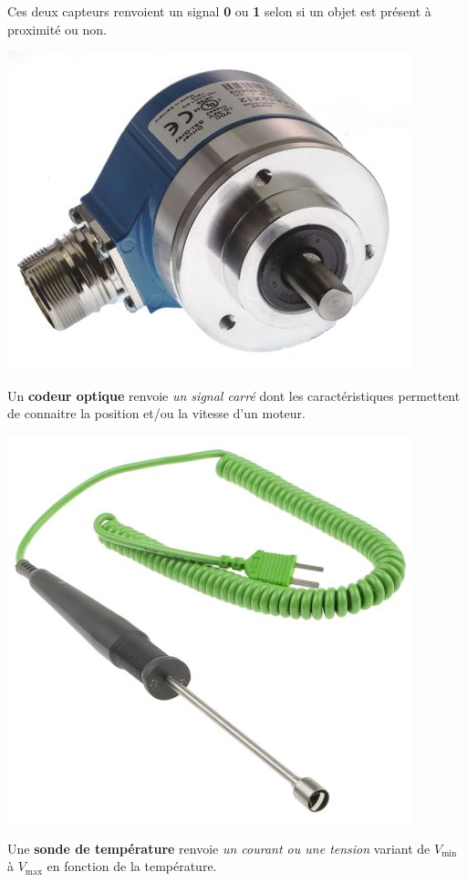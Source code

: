 \begin{UPSTIactivite}
	Ces deux capteurs renvoient un signal \textbf{0} ou \textbf{1} selon si un objet est présent à proximité ou non.




		\begin{minipage}[b]{.9\textwidth}
		\begin{center}
			\includegraphics[width=.2\textwidth,height=.3\textheight,keepaspectratio]{images/codeur_optique}
		\end{center}

			Un \textbf{codeur optique} renvoie \textit{un signal carré} dont les caractéristiques permettent de connaitre la position et/ou la vitesse d'un moteur.
		\end{minipage}



			\begin{minipage}[b]{.9\textwidth}
			\begin{center}
				\includegraphics[width=.2\textwidth,height=.3\textheight,keepaspectratio]{images/sondeTemperature}
			\end{center}

				Une \textbf{sonde de température} renvoie \textit{un courant ou une tension} variant de $V_{\text{min}}$ à  $V_{\text{max}}$ en fonction de la température.
			\end{minipage}


\end{UPSTIactivite}
